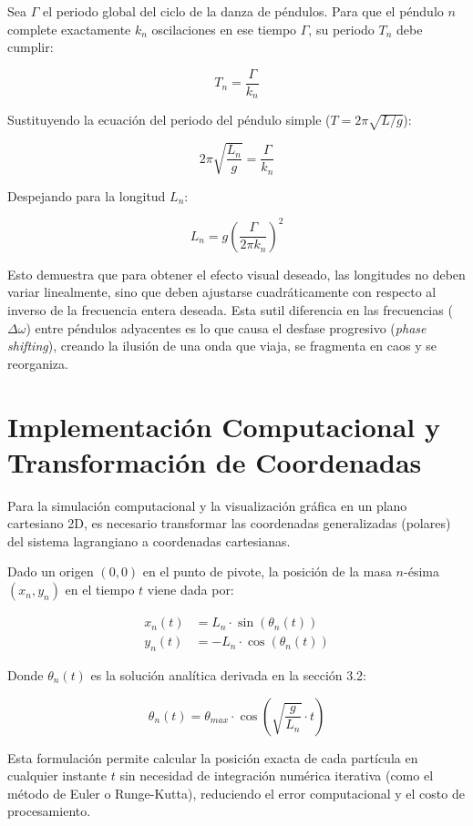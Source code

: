 \documentclass[12pt, a4paper]{article}
\begin{document}
	Sea $\Gamma$ el periodo global del ciclo de la danza de péndulos. Para que el péndulo $n$ complete exactamente $k_n$ oscilaciones en ese tiempo $\Gamma$, su periodo $T_n$ debe cumplir:
	
	\begin{equation}
		T_n = \frac{\Gamma}{k_n}
	\end{equation}
	
	Sustituyendo la ecuación del periodo del péndulo simple ($T = 2\pi\sqrt{L/g}$):
	
	\begin{equation}
		2\pi \sqrt{\frac{L_n}{g}} = \frac{\Gamma}{k_n}
	\end{equation}
	
	Despejando para la longitud $L_n$:
	
	\begin{equation}
		L_n = g \left( \frac{\Gamma}{2\pi k_n} \right)^2
	\end{equation}
	
	Esto demuestra que para obtener el efecto visual deseado, las longitudes no deben variar linealmente, sino que deben ajustarse cuadráticamente con respecto al inverso de la frecuencia entera deseada. Esta sutil diferencia en las frecuencias ($\Delta \omega$) entre péndulos adyacentes es lo que causa el desfase progresivo (\textit{phase shifting}), creando la ilusión de una onda que viaja, se fragmenta en caos y se reorganiza.
	
	\section{Implementación Computacional y Transformación de Coordenadas}
	
	Para la simulación computacional y la visualización gráfica en un plano cartesiano 2D, es necesario transformar las coordenadas generalizadas (polares) del sistema lagrangiano a coordenadas cartesianas.
	
	Dado un origen $(0,0)$ en el punto de pivote, la posición de la masa $n$-ésima $(x_n, y_n)$ en el tiempo $t$ viene dada por:
	
	\begin{align}
		x_n(t) &= L_n \cdot \sin(\theta_n(t)) \\
		y_n(t) &= -L_n \cdot \cos(\theta_n(t))
	\end{align}
	
	Donde $\theta_n(t)$ es la solución analítica derivada en la sección 3.2:
	
	\begin{equation}
		\theta_n(t) = \theta_{max} \cdot \cos\left(\sqrt{\frac{g}{L_n}} \cdot t\right)
	\end{equation}
	
	Esta formulación permite calcular la posición exacta de cada partícula en cualquier instante $t$ sin necesidad de integración numérica iterativa (como el método de Euler o Runge-Kutta), reduciendo el error computacional y el costo de procesamiento.
	
\end{document}
